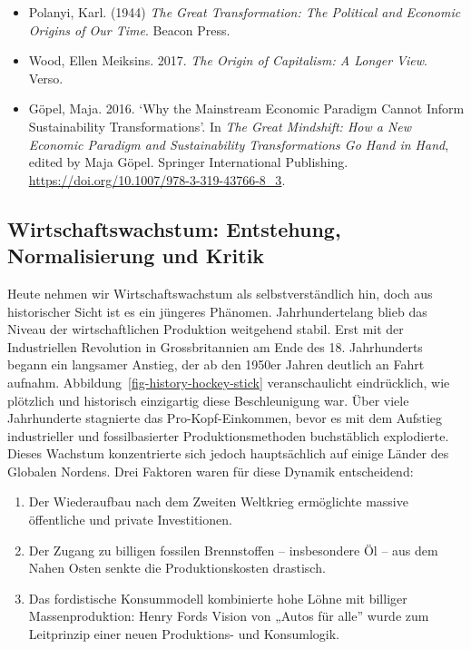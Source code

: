 \documentclass[
  nswissgerman,
  a4paper,
  openany]{book}
\providecommand{\tightlist}{%
  \setlength{\itemsep}{0pt}\setlength{\parskip}{0pt}}
\begin{document}
\begin{tcolorbox}[enhanced jigsaw, arc=.35mm, bottomrule=.15mm, bottomtitle=1mm, breakable, colback=white, colbacktitle=quarto-callout-caution-color!10!white, colframe=quarto-callout-caution-color-frame, coltitle=black, left=2mm, leftrule=.75mm, opacityback=0, opacitybacktitle=0.6, rightrule=.15mm, title={Weiterführende Literatur}, titlerule=0mm, toprule=.15mm, toptitle=1mm]

\begin{itemize}
\item
  Polanyi, Karl. (1944) \emph{The Great Transformation: The Political
  and Economic Origins of Our Time}. Beacon Press.
\item
  Wood, Ellen Meiksins. 2017. \emph{The Origin of Capitalism: A Longer
  View}. Verso.
\item
  Göpel, Maja. 2016. `Why the Mainstream Economic Paradigm Cannot Inform
  Sustainability Transformations'. In \emph{The Great Mindshift: How a
  New Economic Paradigm and Sustainability Transformations Go Hand in
  Hand}, edited by Maja Göpel. Springer International Publishing.
  \url{https://doi.org/10.1007/978-3-319-43766-8_3}.
\end{itemize}

\end{tcolorbox}

\subsection{Wirtschaftswachstum: Entstehung, Normalisierung und
Kritik}\label{wirtschaftswachstum-entstehung-normalisierung-und-kritik}

Heute nehmen wir Wirtschaftswachstum als selbstverständlich hin, doch
aus historischer Sicht ist es ein jüngeres Phänomen. Jahrhundertelang
blieb das Niveau der wirtschaftlichen Produktion weitgehend stabil. Erst
mit der Industriellen Revolution in Grossbritannien am Ende des 18.
Jahrhunderts begann ein langsamer Anstieg, der ab den 1950er Jahren
deutlich an Fahrt aufnahm. Abbildung~\ref{fig-history-hockey-stick}
veranschaulicht eindrücklich, wie plötzlich und historisch einzigartig
diese Beschleunigung war. Über viele Jahrhunderte stagnierte das
Pro-Kopf-Einkommen, bevor es mit dem Aufstieg industrieller und
fossilbasierter Produktionsmethoden buchstäblich explodierte. Dieses
Wachstum konzentrierte sich jedoch hauptsächlich auf einige Länder des
Globalen Nordens. Drei Faktoren waren für diese Dynamik entscheidend:

\begin{enumerate}
\def\labelenumi{\arabic{enumi}.}
\tightlist
\item
  Der Wiederaufbau nach dem Zweiten Weltkrieg ermöglichte massive
  öffentliche und private Investitionen.
\item
  Der Zugang zu billigen fossilen Brennstoffen -- insbesondere Öl -- aus
  dem Nahen Osten senkte die Produktionskosten drastisch.
\item
  Das fordistische Konsummodell kombinierte hohe Löhne mit billiger
  Massenproduktion: Henry Fords Vision von „Autos für alle'' wurde zum
  Leitprinzip einer neuen Produktions- und Konsumlogik.
\end{enumerate}
\end{document}
